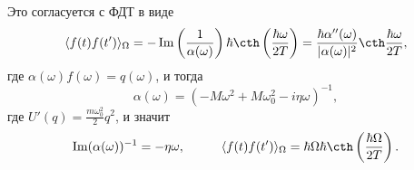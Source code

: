 Это согласуется с ФДТ в виде
\begin{equation*}
	\langle f(t) f(t')\rangle_\Omega = - \Im\left(\frac{1}{\alpha(\omega)}\right) \hbar \cth\left(\frac{\hbar \omega}{2T}\right) = \frac{\hbar \alpha''(\omega)}{|\alpha(\omega)|^2} \cth \frac{\hbar \omega}{2T},
\end{equation*}
где $\alpha(\omega) f(\omega) = q(\omega)$, и тогда
\begin{equation*}
	\alpha(\omega) = \left(-M \omega^2 + M \omega_0^2 - i \eta \omega\right)^{-1},
\end{equation*}
где $U'(q) = \frac{m \omega_0^2}{2} q^2$, и значит
\begin{equation*}
	\Im(\alpha(\omega))^{-1} = - \eta \omega,
	\hspace{10 mm} 
	\langle f(t) f(t')\rangle_\Omega = \hbar \Omega \hbar \cth\left(\frac{\hbar \Omega}{2T}\right).
\end{equation*}